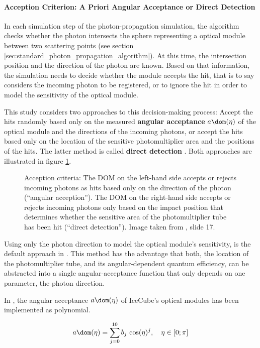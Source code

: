 \paragraph{Acception Criterion: A Priori Angular Acceptance or Direct Detection}
In each simulation step of the photon-propagation simulation, the algorithm checks whether the photon intersects the sphere representing a optical module between two scattering points (see section \ref{sec:standard_photon_propagation_algorithm}). At this time, the intersection position and the direction of the photon are known. Based on that information, the simulation needs to decide whether the module accepts the hit, that is to say considers the incoming photon to be registered, or to ignore the hit in order to model the sensitivity of the optical module.

This study considers two approaches to this decision-making process: Accept the hits randomly based only on the measured \textbf{angular acceptance} $a\dom(\eta)$ of the optical module and the directions of the incoming photons, or accept the hits based only on the location of the sensitive photomultiplier area and the positions of the hits. The latter method is called \textbf{direct detection} \cite{martinspicehddard}. Both approaches are illustrated in figure \ref{fig:kieQuoh1}.

\begin{figure}[htbp]
  \centering
  \caption{Acception criteria: The DOM on the left-hand side accepts or rejects incoming photons as hits based only on the direction of the photon (``angular acception''). The DOM on the right-hand side accepts or rejects incoming photons only based on the impact position that determines whether the sensitive area of the photomultiplier tube has been hit (``direct detection''). Image taken from \cite{martinspicehddard}, slide 17.}
  \label{fig:kieQuoh1}
\end{figure}

Using only the photon direction to model the optical module's sensitivity, is the default approach in . This method has the advantage that both, the location of the photomultiplier tube, and its angular-dependent quantum efficiency, can be abstracted into a single angular-acceptance function that only depends on one parameter, the photon direction.

In , the angular acceptance $a\dom(\eta)$ of IceCube's optical modules has been implemented as polynomial.

\begin{equation}
  a\dom(\eta) = \sum_{j = 0}^{10} b_j\,\cos(\eta)^j, \ \ \ \eta \in [0; \pi]
\end{equation}

